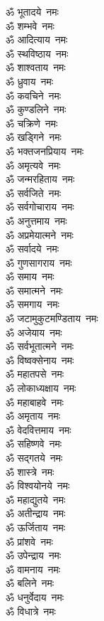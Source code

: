 \begin{multicols}{2}
\begin{flushleft}
ॐ भूतादये~नमः\\
ॐ शम्भवे~नमः\\
ॐ आदित्याय~नमः\\
ॐ स्थविष्ठाय~नमः\\
ॐ शाश्वताय~नमः\\
ॐ ध्रुवाय~नमः\hfill{}\\
ॐ कवचिने~नमः\\
ॐ कुण्डलिने~नमः\\
ॐ चक्रिणे~नमः\\
ॐ खड्गिने~नमः\\
ॐ भक्तजनप्रियाय~नमः\\
ॐ अमृत्यवे~नमः\\
ॐ जन्मरहिताय~नमः\\
ॐ सर्वजिते~नमः\\
ॐ सर्वगोचाराय~नमः\\
ॐ अनुत्तमाय~नमः\hfill{}\\
ॐ अप्रमेयात्मने~नमः\\
ॐ सर्वादये~नमः\\
ॐ गुणसागराय~नमः\\
ॐ समाय~नमः\\
ॐ समात्मने~नमः\\
ॐ समगाय~नमः\\
ॐ जटामुकुटमण्डिताय~नमः\\
ॐ अजेयाय~नमः\\
ॐ सर्वभूतात्मने~नमः\\
ॐ विष्वक्सेनाय~नमः\hfill{}\\
ॐ महातपसे~नमः\\
ॐ लोकाध्यक्षाय~नमः\\
ॐ महाबाहवे~नमः\\
ॐ अमृताय~नमः\\
ॐ वेदवित्तमाय~नमः\\
ॐ सहिष्णवे~नमः\\
ॐ सद्गतये~नमः\\
ॐ शास्त्रे~नमः\\
ॐ विश्वयोनये~नमः\\
ॐ महाद्युतये~नमः\hfill{}\\
ॐ अतीन्द्राय~नमः\\
ॐ ऊर्जिताय~नमः\\
ॐ प्रांशवे~नमः\\
ॐ उपेन्द्राय~नमः\\
ॐ वामनाय~नमः\\
ॐ बलिने~नमः\\
ॐ धनुर्वेदाय~नमः\\
ॐ विधात्रे~नमः\\

\end{flushleft}
\end{multicols}

